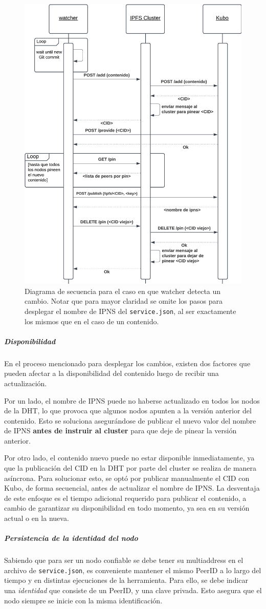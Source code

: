 \begin{figure}[h!]
    \centering
    \includegraphics[width=0.5\linewidth]{img/solucion-ipfs/ds-trusted-peer.png}
    \caption{Diagrama de secuencia para el caso en que watcher detecta un cambio. Notar que para mayor claridad se omite los pasos para desplegar el nombre de IPNS del \texttt{service.json}, al ser exactamente los mismos que en el caso de un contenido.}
    \label{fig:contenedores-trusted-peer}
\end{figure}

\subparagraph{Disponibilidad} En el proceso mencionado para desplegar los cambios, existen dos factores que pueden afectar a la disponibilidad del contenido luego de recibir una actualización.

Por un lado, el nombre de IPNS puede no haberse actualizado en todos los nodos de la DHT, lo que provoca que algunos nodos apunten a la versión anterior del contenido. Esto se soluciona asegurándose de publicar el nuevo valor del nombre de IPNS \textbf{antes de instruir al cluster} para que deje de pinear la versión anterior.

Por otro lado, el contenido nuevo puede no estar disponible inmediatamente, ya que la publicación del CID en la DHT por parte del cluster se realiza de manera asíncrona. Para solucionar esto, se optó por publicar manualmente el CID con Kubo, de forma secuencial, antes de actualizar el nombre de IPNS. La desventaja de este enfoque es el tiempo adicional requerido para publicar el contenido, a cambio de garantizar su disponibilidad en todo momento, ya sea en su versión actual o en la nueva.

\subparagraph{Persistencia de la identidad del nodo}

Sabiendo que para ser un nodo confiable se debe tener su multiaddress en el archivo de \texttt{service.json}, es conveniente mantener el mismo PeerID a lo largo del tiempo y en distintas ejecuciones de la herramienta. Para ello, se debe indicar una \textit{identidad} que consiste de un PeerID, y una clave privada. Esto asegura que el nodo siempre se inicie con la misma identificación.

